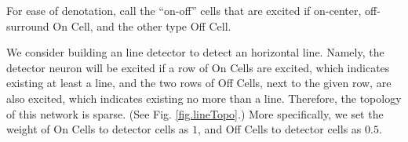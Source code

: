 \documentclass[11pt]{article}
\begin{document}
    For ease of denotation, call the ``on-off'' cells that are excited if on-center, off-surround On Cell, and the other type Off Cell.
    
    We consider building an line detector to detect an horizontal line. Namely, the detector neuron will be excited if a row of On Cells are excited, which indicates existing at least a line, and the two rows of Off Cells, next to the given row, are also excited, which indicates existing no more than a line. Therefore, the topology of this network is sparse. (See Fig. \ref{fig.lineTopo}.) More specifically, we set the weight of On Cells to detector cells as $1$, and Off Cells to detector cells as $0.5$.
    \begin{figure}[htbp]
    \centering
        
    
        \begin{tikzpicture}[x=0.75pt,y=0.75pt,yscale=-1,xscale=1]
    

\end{tikzpicture}
\end{figure}
\end{document}

